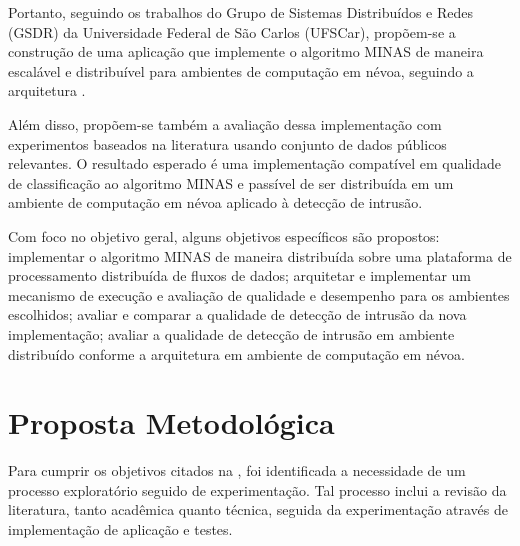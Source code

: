 Portanto, seguindo os trabalhos do Grupo de Sistemas Distribuídos e Redes (GSDR)
da Universidade Federal de São Carlos (UFSCar), propõem-se a construção de uma
aplicação que implemente o algoritmo MINAS \cite{Faria2016minas} de maneira
escalável e distribuível para ambientes de computação em névoa, seguindo a
arquitetura \arch \cite{Cassales2019a}.

Além disso, propõem-se também a avaliação dessa implementação com experimentos
baseados na literatura usando conjunto de dados públicos relevantes.
O resultado esperado é uma implementação compatível em qualidade de
classificação ao algoritmo MINAS e passível de ser distribuída em um ambiente de
computação em névoa aplicado à detecção de intrusão.

Com foco no objetivo geral, alguns objetivos específicos são propostos:
implementar o algoritmo MINAS de maneira distribuída sobre uma plataforma de
processamento distribuída de fluxos de dados;
arquitetar e implementar um mecanismo de execução e avaliação de qualidade e
desempenho para os ambientes escolhidos;
avaliar e comparar a qualidade de detecção de intrusão da nova implementação;
avaliar a qualidade de detecção de intrusão em ambiente distribuído conforme a
arquitetura \arch em ambiente de computação em névoa.



\section{Proposta Metodológica}

Para cumprir os objetivos citados na , foi identificada a necessidade
de um processo exploratório seguido de experimentação. Tal processo inclui a
revisão da literatura, tanto acadêmica quanto técnica, seguida da experimentação
através de implementação de aplicação e testes.


